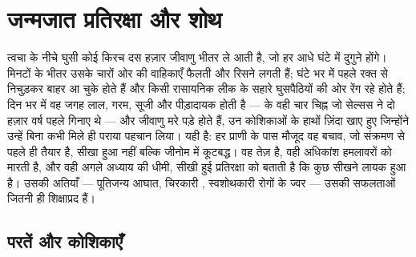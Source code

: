 \chapter{जन्मजात प्रतिरक्षा और शोथ}\label{ch:b3:innate-immunity}

त्वचा के नीचे घुसी कोई किरच दस हज़ार जीवाणु भीतर ले आती है, जो हर आधे
घंटे में दुगुने होंगे। मिनटों के भीतर उसके चारों ओर की वाहिकाएँ फैलती
और रिसने लगती हैं; घंटे भर में पहले  रक्त से निचुड़कर बाहर आ
चुके होते हैं और किसी रासायनिक लीक के सहारे घुसपैठियों की ओर रेंग रहे
होते हैं; दिन भर में वह जगह लाल, गरम, सूजी और पीड़ादायक होती है --- 
के वही चार चिह्न जो सेल्सस ने दो हज़ार वर्ष पहले गिनाए थे --- और जीवाणु
मरे पड़े होते हैं, उन कोशिकाओं के हाथों ज़िंदा खाए हुए जिन्होंने उन्हें
बिना कभी मिले ही पराया पहचान लिया। यही  है: हर प्राणी
के पास मौजूद वह बचाव, जो संक्रमण से पहले ही तैयार है, सीखा हुआ नहीं
बल्कि जीनोम में कूटबद्ध। वह तेज़ है, वही अधिकांश हमलावरों को मारती है,
और वही अगले अध्याय की धीमी, सीखी हुई प्रतिरक्षा को बताती है कि कुछ
सीखने लायक हुआ है। उसकी अतियाँ --- पूतिजन्य आघात, चिरकारी ,
स्वशोथकारी रोगों के ज्वर --- उसकी सफलताओं जितनी ही शिक्षाप्रद हैं।

\section{परतें और कोशिकाएँ}

